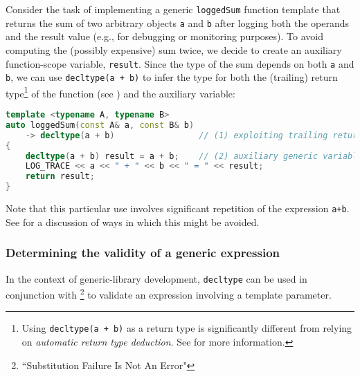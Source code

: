 Consider the task of implementing a generic \lstinline!loggedSum! function
template that returns the sum of two arbitrary objects \lstinline!a! and
\lstinline!b! after logging both the operands and the result value (e.g.,
for debugging or monitoring purposes). To avoid computing the (possibly
expensive) sum twice, we decide to create an auxiliary function-scope
variable, \lstinline!result!. Since the type of the sum depends on both
\lstinline!a! and \lstinline!b!, we can use
\lstinline!decltype(a!~\lstinline!+!~\lstinline!b)! to infer the type for both
the (trailing) return type{\cprotect\footnote{Using
\lstinline!decltype(a!~\lstinline!+!~\lstinline!b)! as a return type is
significantly different from relying on \emph{automatic return type
  deduction}. See %
 for more information.}} of the
function (see %
) and the auxiliary variable:

\begin{lstlisting}[language=C++]
template <typename A, typename B>
auto loggedSum(const A& a, const B& b)
    -> decltype(a + b)                 // (1) exploiting trailing return types
{
    decltype(a + b) result = a + b;    // (2) auxiliary generic variable
    LOG_TRACE << a << " + " << b << " = " << result;
    return result;
}
\end{lstlisting}
Note that this particular use involves significant repetition of the expression \lstinline!a+b!.  See 
for a discussion of ways in which this might be avoided.    

\subsubsection[Determining the validity of a generic expression]{Determining the validity of a generic expression}\label{determining-the-validity-of-a-generic-expression}

In the context of generic-library development, \lstinline!decltype! can be
used in conjunction with \footnote{``Substitution Failure Is Not An Error"} to validate an expression involving a
template parameter.

